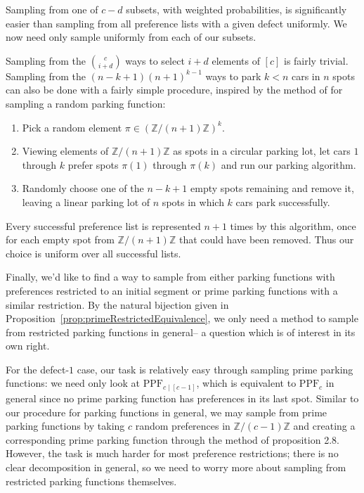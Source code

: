 \documentclass[12 pt]{amsart}
\theoremstyle{definition} %
\theoremstyle{remark} %
\begin{document}
Sampling from one of $c-d$ subsets, with weighted probabilities, is significantly easier than sampling from all preference lists with a given defect uniformly. We now need only sample uniformly from each of our subsets.

Sampling from the $\binom{c}{i+d}$ ways to select $i+d$ elements of $[c]$ is fairly trivial. Sampling from the $(n-k+1)(n+1)^{k-1}$ ways to park $k<n$ cars in $n$ spots can also be done with a fairly simple procedure, inspired by the method of \cite{diaconis-hicks-2017} for sampling a random parking function:

\begin{enumerate}
    \item Pick a random element $\pi\in(\mathbb{Z}/(n+1)\mathbb{Z})^k$.
    \item Viewing elements of $\mathbb{Z}/(n+1)\mathbb{Z}$ as spots in a circular parking lot, let cars $1$ through $k$ prefer spots $\pi(1)$ through $\pi(k)$ and run our parking algorithm.
    \item Randomly choose one of the $n-k+1$ empty spots remaining and remove it, leaving a linear parking lot of $n$ spots in which $k$ cars park successfully.
\end{enumerate}

Every successful preference list is represented $n+1$ times by this algorithm, once for each empty spot from $\mathbb{Z}/(n+1)\mathbb{Z}$ that could have been removed. Thus our choice is uniform over all successful lists.


Finally, we'd like to find a way to sample from either parking functions with preferences restricted to an initial segment or prime parking functions with a similar restriction. By the natural bijection given in Proposition~\ref{prop:primeRestrictedEquivalence}, we only need a method to sample from restricted parking functions in general-- a question which is of interest in its own right.

For the defect-$1$ case, our task is relatively easy through sampling prime parking functions: we need only look at $\mathrm{PPF}_{c\mid [c-1]}$, which is equivalent to $\mathrm{PPF}_c$ in general since no prime parking function has preferences in its last spot. Similar to our procedure for parking functions in general, we may sample from prime parking functions by taking $c$ random preferences in $\mathbb{Z}/(c-1)\mathbb{Z}$ and creating a corresponding prime parking function through the method of proposition 2.8. However, the task is much harder for most preference restrictions; there is no clear decomposition in general, so we need to worry more about sampling from restricted parking functions themselves.
\end{document}
